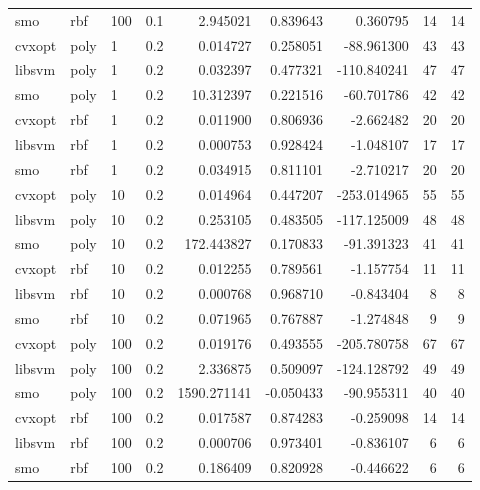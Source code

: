 \begin{tabular}{llllrrrrr}
   smo &    rbf & 100 &     0.1 &    2.945021 &  0.839643 &    0.360795 &           14 &         14 \\
cvxopt &   poly &   1 &     0.2 &    0.014727 &  0.258051 &  -88.961300 &           43 &         43 \\
libsvm &   poly &   1 &     0.2 &    0.032397 &  0.477321 & -110.840241 &           47 &         47 \\
   smo &   poly &   1 &     0.2 &   10.312397 &  0.221516 &  -60.701786 &           42 &         42 \\
cvxopt &    rbf &   1 &     0.2 &    0.011900 &  0.806936 &   -2.662482 &           20 &         20 \\
libsvm &    rbf &   1 &     0.2 &    0.000753 &  0.928424 &   -1.048107 &           17 &         17 \\
   smo &    rbf &   1 &     0.2 &    0.034915 &  0.811101 &   -2.710217 &           20 &         20 \\
cvxopt &   poly &  10 &     0.2 &    0.014964 &  0.447207 & -253.014965 &           55 &         55 \\
libsvm &   poly &  10 &     0.2 &    0.253105 &  0.483505 & -117.125009 &           48 &         48 \\
   smo &   poly &  10 &     0.2 &  172.443827 &  0.170833 &  -91.391323 &           41 &         41 \\
cvxopt &    rbf &  10 &     0.2 &    0.012255 &  0.789561 &   -1.157754 &           11 &         11 \\
libsvm &    rbf &  10 &     0.2 &    0.000768 &  0.968710 &   -0.843404 &            8 &          8 \\
   smo &    rbf &  10 &     0.2 &    0.071965 &  0.767887 &   -1.274848 &            9 &          9 \\
cvxopt &   poly & 100 &     0.2 &    0.019176 &  0.493555 & -205.780758 &           67 &         67 \\
libsvm &   poly & 100 &     0.2 &    2.336875 &  0.509097 & -124.128792 &           49 &         49 \\
   smo &   poly & 100 &     0.2 & 1590.271141 & -0.050433 &  -90.955311 &           40 &         40 \\
cvxopt &    rbf & 100 &     0.2 &    0.017587 &  0.874283 &   -0.259098 &           14 &         14 \\
libsvm &    rbf & 100 &     0.2 &    0.000706 &  0.973401 &   -0.836107 &            6 &          6 \\
   smo &    rbf & 100 &     0.2 &    0.186409 &  0.820928 &   -0.446622 &            6 &          6 \\

\end{tabular}
